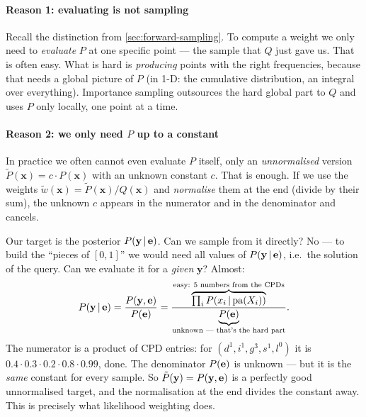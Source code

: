 \documentclass[11pt, oneside]{book}
\newcommand{\Prob}{\mathbb{P}}           %
\newcommand{\given}{\,\vert\,}           %
\newcommand{\pa}{\mathrm{pa}}            %
\newcommand{\bx}{\mathbf{x}}  \newcommand{\by}{\mathbf{y}}
\begin{document}
\paragraph{Reason 1: evaluating is not sampling} Recall the distinction from
\cref{sec:forward-sampling}. To compute a weight we only need to
\emph{evaluate} $P$ at one specific point --- the sample that $Q$ just gave
us. That is often easy. What is hard is \emph{producing} points with the right
frequencies, because that needs a global picture of $P$ (in 1-D: the
cumulative distribution, an integral over everything). Importance sampling
outsources the hard global part to $Q$ and uses $P$ only locally, one point at
a time.

\paragraph{Reason 2: we only need $P$ up to a constant} In practice we often
cannot even evaluate $P$ itself, only an \emph{unnormalised} version $\tilde
P(\bx) = c \cdot P(\bx)$ with an unknown constant $c$. That is enough. If we
use the weights $\tilde w(\bx) = \tilde P(\bx)/Q(\bx)$ and \emph{normalise}
them at the end (divide by their sum), the unknown $c$ appears in the
numerator and in the denominator and cancels.

\begin{exbox}[title={Both reasons at once, in a Bayesian network}]
Our target is the posterior $P(\by \given \be)$. Can we sample from it
directly? No --- to build the ``pieces of $[0,1]$'' we would need all values of
$P(\by \given \be)$, i.e.\ the solution of the query. Can we evaluate it for a
\emph{given} $\by$? Almost:
\[
P(\by \given \be) = \frac{P(\by, \be)}{P(\be)}
= \frac{\overbrace{\textstyle\prod_i P(x_i \given \pa(X_i))}^{\text{easy: 5 numbers from the CPDs}}}{\underbrace{P(\be)}_{\text{unknown --- that's the hard part}}} .
\]
The numerator is a product of CPD entries: for $(d^1, i^1, g^3, s^1, l^0)$
it is $0.4 \cdot 0.3 \cdot 0.2 \cdot 0.8 \cdot 0.99$, done. The denominator
$P(\mathbf{e})$ is unknown --- but it is the \emph{same} constant for every sample.
So $\tilde P(\by) = P(\by, \be)$ is a perfectly good unnormalised target, and
the normalisation at the end divides the constant away. This is precisely
what likelihood weighting does.
\end{exbox}
\end{document}
